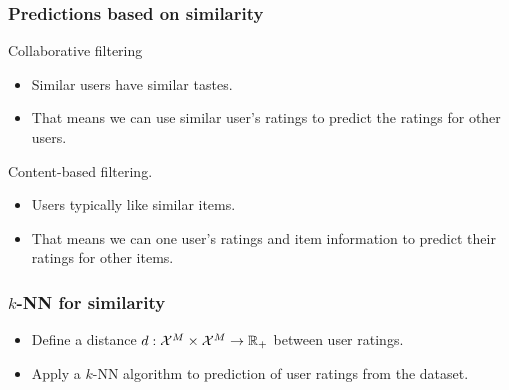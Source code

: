 \begin{frame}
\frametitle{Predictions based on similarity}
\begin{block}{Collaborative filtering}
  \begin{itemize}
  \item \alert{Similar users have similar tastes}. 
  \item That means we can use similar user's \alert{ratings} to predict the ratings for other users. 
  \end{itemize}
\end{block}
\begin{block}{Content-based filtering.}
  \begin{itemize}
  \item Users typically like similar items. 
  \item That means we can one user's ratings and \alert{item information} to predict their ratings for other items. 
  \end{itemize}
\end{block}
\end{frame}


\begin{frame}
  \frametitle{$k$-NN for similarity}
  \begin{exercise}
    \begin{itemize}
      \item Define a distance $d : {\mathcal{X}}^M \times {\mathcal{X}}^M \to {\mathbb{R}}_+$ between user ratings.
      \item Apply a $k$-NN algorithm to prediction of user ratings from the dataset.
    \end{itemize}
  \end{exercise}
\end{frame}



